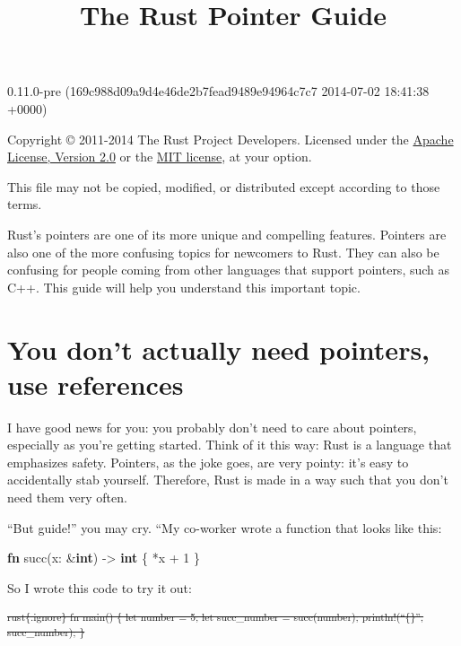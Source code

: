 \documentclass[]{article}
\title{The Rust Pointer Guide}
\newenvironment{Shaded}{}{}
\newcommand{\KeywordTok}[1]{\textcolor[rgb]{0.00,0.44,0.13}{\textbf{{#1}}}}
\newcommand{\DecValTok}[1]{\textcolor[rgb]{0.25,0.63,0.44}{{#1}}}
\newcommand{\NormalTok}[1]{{#1}}
\begin{document}
\maketitle

0.11.0-pre (169c988d09a9d4e46de2b7fead9489e94964c7c7 2014-07-02 18:41:38 +0000)

Copyright © 2011-2014 The Rust Project Developers. Licensed under the
\href{http://www.apache.org/licenses/LICENSE-2.0}{Apache License,
Version 2.0} or the \href{http://opensource.org/licenses/MIT}{MIT
license}, at your option.

This file may not be copied, modified, or distributed except according
to those terms.

{
\hypersetup{linkcolor=black}
\setcounter{tocdepth}{3}
\tableofcontents
}
Rust's pointers are one of its more unique and compelling features.
Pointers are also one of the more confusing topics for newcomers to
Rust. They can also be confusing for people coming from other languages
that support pointers, such as C++. This guide will help you understand
this important topic.

\section{You don't actually need pointers, use
references}\label{you-dont-actually-need-pointers-use-references}

I have good news for you: you probably don't need to care about
pointers, especially as you're getting started. Think of it this way:
Rust is a language that emphasizes safety. Pointers, as the joke goes,
are very pointy: it's easy to accidentally stab yourself. Therefore,
Rust is made in a way such that you don't need them very often.

``But guide!'' you may cry. ``My co-worker wrote a function that looks
like this:

\begin{Shaded}
\begin{Highlighting}[]
\KeywordTok{fn} \NormalTok{succ(x: &}\KeywordTok{int}\NormalTok{) -> }\KeywordTok{int} \NormalTok{\{ *x + }\DecValTok{1} \NormalTok{\}}
\end{Highlighting}
\end{Shaded}

So I wrote this code to try it out:

\textsubscript{\sout{rust\{.ignore\} fn main() \{ let number = 5; let
succ\_number = succ(number); println!(``\{\}'', succ\_number); \}}}
\end{document}
